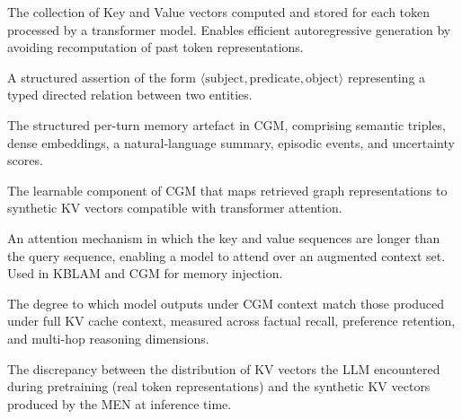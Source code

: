 \documentclass[11pt, a4paper, twoside]{article}
\theoremstyle{definition}
\newcommand{\CGM}{\textsc{CGM}\xspace}
\begin{document}
\begin{description}[leftmargin=*, style=nextline]
  \item[KV Cache:] The collection of Key and Value vectors computed and stored
    for each token processed by a transformer model. Enables efficient
    autoregressive generation by avoiding recomputation of past token representations.
  \item[Semantic Triple:] A structured assertion of the form
    $\langle\text{subject}, \text{predicate}, \text{object}\rangle$ representing
    a typed directed relation between two entities.
  \item[Hybrid Memory Object (HMO):] The structured per-turn memory artefact
    in \CGM, comprising semantic triples, dense embeddings, a natural-language
    summary, episodic events, and uncertainty scores.
  \item[Memory Encoder Network (MEN):] The learnable component of \CGM that
    maps retrieved graph representations to synthetic KV vectors compatible
    with transformer attention.
  \item[Rectangular Attention:] An attention mechanism in which the key and value
    sequences are longer than the query sequence, enabling a model to attend
    over an augmented context set. Used in KBLAM and \CGM for memory injection.
  \item[Fidelity:] The degree to which model outputs under \CGM context match
    those produced under full KV cache context, measured across factual recall,
    preference retention, and multi-hop reasoning dimensions.
  \item[Distribution Shift:] The discrepancy between the distribution of KV
    vectors the LLM encountered during pretraining (real token representations)
    and the synthetic KV vectors produced by the MEN at inference time.
\end{description}
\end{document}
